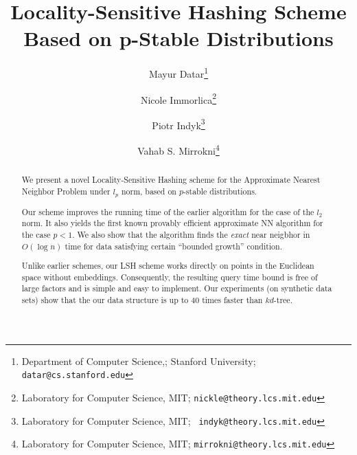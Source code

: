 \documentclass[12pt]{article}
\begin{document}


\title{Locality-Sensitive Hashing Scheme Based on p-Stable Distributions}

\author{Mayur Datar\thanks{Department of Computer Science,; Stanford
      University; {\tt datar@cs.stanford.edu}}%
   \and%
   Nicole Immorlica\thanks{Laboratory for Computer Science, MIT;
      {\tt nickle@theory.lcs.mit.edu}} %
   \and%
   Piotr Indyk\thanks{Laboratory for Computer Science, MIT; {\tt
         indyk@theory.lcs.mit.edu} }
   \and Vahab S. Mirrokni\thanks{Laboratory for Computer Science, MIT;
   {\tt mirrokni@theory.lcs.mit.edu}}}

\date{}

\maketitle

\begin{abstract}
We present a novel Locality-Sensitive Hashing scheme for the Approximate 
Nearest Neighbor Problem under $l_p$ norm, based on $p$-stable distributions.

Our scheme improves the running time of the earlier algorithm for the case of the $l_2$ norm.
It also yields the first known provably efficient approximate NN algorithm for 
the case $p <1$.  We also show that the algorithm finds the {\em exact} near neigbhor in $O(\log n)$ time for data satisfying certain ``bounded growth'' condition.

Unlike earlier schemes, our LSH scheme works directly on points 
in the Euclidean space without embeddings. Consequently, the resulting 
query time bound is free of large factors and is simple and easy to 
implement. Our experiments (on synthetic data sets) show that the our data structure is up to 40 
times faster than $kd$-tree.
\end{abstract}

\end{document}
